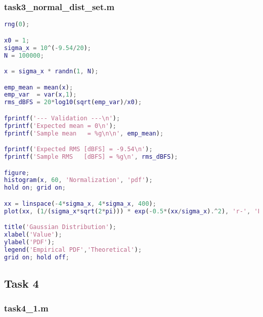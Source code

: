 \subsubsection{task3\_normal\_dist\_set.m}
\begin{lstlisting}[language=Matlab]
rng(0);

x0 = 1;
sigma_x = 10^(-9.54/20);
N = 100000;

x = sigma_x * randn(1, N);

emp_mean = mean(x);
emp_var  = var(x,1);
rms_dBFS = 20*log10(sqrt(emp_var)/x0);

fprintf('--- Validation ---\n');
fprintf('Expected mean = 0\n');
fprintf('Sample mean   = %g\n\n', emp_mean);

fprintf('Expected RMS [dBFS] = -9.54\n');
fprintf('Sample RMS   [dBFS] = %g\n', rms_dBFS);

figure;
histogram(x, 60, 'Normalization', 'pdf');
hold on; grid on;

xx = linspace(-4*sigma_x, 4*sigma_x, 400);
plot(xx, (1/(sigma_x*sqrt(2*pi))) * exp(-0.5*(xx/sigma_x).^2), 'r-', 'LineWidth',1.5);

title('Gaussian Distribution');
xlabel('Value');
ylabel('PDF');
legend('Empirical PDF','Theoretical');
grid on; hold off;
\end{lstlisting}

\subsection{Task 4}
\subsubsection{task4\_1.m}

